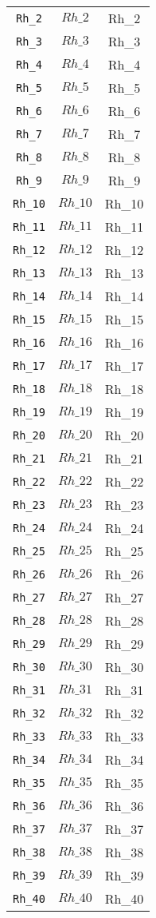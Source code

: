 \begin{center}
\begin{longtable}{ccc}
\texttt{Rh\_2} & $Rh\_2$ & Rh\_2\\
\texttt{Rh\_3} & $Rh\_3$ & Rh\_3\\
\texttt{Rh\_4} & $Rh\_4$ & Rh\_4\\
\texttt{Rh\_5} & $Rh\_5$ & Rh\_5\\
\texttt{Rh\_6} & $Rh\_6$ & Rh\_6\\
\texttt{Rh\_7} & $Rh\_7$ & Rh\_7\\
\texttt{Rh\_8} & $Rh\_8$ & Rh\_8\\
\texttt{Rh\_9} & $Rh\_9$ & Rh\_9\\
\texttt{Rh\_10} & $Rh\_10$ & Rh\_10\\
\texttt{Rh\_11} & $Rh\_11$ & Rh\_11\\
\texttt{Rh\_12} & $Rh\_12$ & Rh\_12\\
\texttt{Rh\_13} & $Rh\_13$ & Rh\_13\\
\texttt{Rh\_14} & $Rh\_14$ & Rh\_14\\
\texttt{Rh\_15} & $Rh\_15$ & Rh\_15\\
\texttt{Rh\_16} & $Rh\_16$ & Rh\_16\\
\texttt{Rh\_17} & $Rh\_17$ & Rh\_17\\
\texttt{Rh\_18} & $Rh\_18$ & Rh\_18\\
\texttt{Rh\_19} & $Rh\_19$ & Rh\_19\\
\texttt{Rh\_20} & $Rh\_20$ & Rh\_20\\
\texttt{Rh\_21} & $Rh\_21$ & Rh\_21\\
\texttt{Rh\_22} & $Rh\_22$ & Rh\_22\\
\texttt{Rh\_23} & $Rh\_23$ & Rh\_23\\
\texttt{Rh\_24} & $Rh\_24$ & Rh\_24\\
\texttt{Rh\_25} & $Rh\_25$ & Rh\_25\\
\texttt{Rh\_26} & $Rh\_26$ & Rh\_26\\
\texttt{Rh\_27} & $Rh\_27$ & Rh\_27\\
\texttt{Rh\_28} & $Rh\_28$ & Rh\_28\\
\texttt{Rh\_29} & $Rh\_29$ & Rh\_29\\
\texttt{Rh\_30} & $Rh\_30$ & Rh\_30\\
\texttt{Rh\_31} & $Rh\_31$ & Rh\_31\\
\texttt{Rh\_32} & $Rh\_32$ & Rh\_32\\
\texttt{Rh\_33} & $Rh\_33$ & Rh\_33\\
\texttt{Rh\_34} & $Rh\_34$ & Rh\_34\\
\texttt{Rh\_35} & $Rh\_35$ & Rh\_35\\
\texttt{Rh\_36} & $Rh\_36$ & Rh\_36\\
\texttt{Rh\_37} & $Rh\_37$ & Rh\_37\\
\texttt{Rh\_38} & $Rh\_38$ & Rh\_38\\
\texttt{Rh\_39} & $Rh\_39$ & Rh\_39\\
\texttt{Rh\_40} & $Rh\_40$ & Rh\_40\\
\hline%
\end{longtable}
\end{center}
